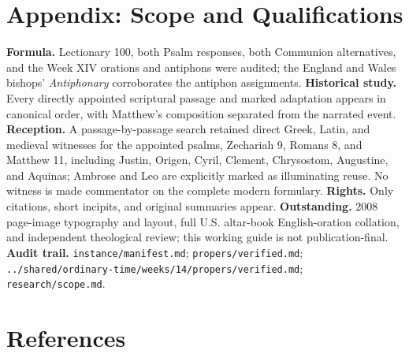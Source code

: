 \section*{Appendix: Scope and Qualifications}

\begin{studyframe}
\textbf{Formula.} Lectionary 100, both Psalm responses, both Communion alternatives, and the Week XIV orations and antiphons were audited; the England and Wales bishops' \emph{Antiphonary} corroborates the antiphon assignments. \textbf{Historical study.} Every directly appointed scriptural passage and marked adaptation appears in canonical order, with Matthew's composition separated from the narrated event. \textbf{Reception.} A passage-by-passage search retained direct Greek, Latin, and medieval witnesses for the appointed psalms, Zechariah 9, Romans 8, and Matthew 11, including Justin, Origen, Cyril, Clement, Chrysostom, Augustine, and Aquinas; Ambrose and Leo are explicitly marked as illuminating reuse. No witness is made commentator on the complete modern formulary. \textbf{Rights.} Only citations, short incipits, and original summaries appear. \textbf{Outstanding.} 2008 page-image typography and layout, full U.S. altar-book English-oration collation, and independent theological review; this working guide is not publication-final. \textbf{Audit trail.} \nolinkurl{instance/manifest.md}; \nolinkurl{propers/verified.md}; \nolinkurl{../shared/ordinary-time/weeks/14/propers/verified.md}; \nolinkurl{research/scope.md}.
\end{studyframe}

\section*{References}

